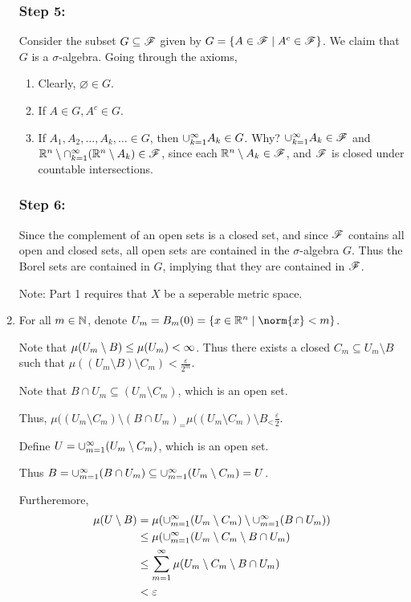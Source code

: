 \documentclass[x11names,reqno,14pt]{extarticle}
\newcommand{\seq}[2][\oo]{_{#2 = 1}^#1}
\newcommand{\cupk}[1][\oo]{\cup\seq[#1]{k}}
\newcommand{\capk}[1][\oo]{\cap\seq[#1]{k}}
\begin{document}
\begin{enumerate}
\subsubsection*{Step 5:} Consider the subset $G \subseteq\mathscr{F}$ given by $G = \{A\in\mathscr{F}\mid A^c\in\mathscr{F}\}$. We claim that $G$ is a $\sigma$-algebra. Going through the axioms, 
\begin{enumerate}[label=(\roman*)]

\item Clearly, $\varnothing\in G$. 

\item If $A \in G, A^c \in G$. 

\item If $A_1, A_2, \dots, A_k, \dots \in G$, then $\cupk A_k \in G$. Why? $\cupk A_k \in \ms{F}$ and $\R^n\setminus\capk(\R^n\setminus A_k) \in\ms{F}$, since each $\mathbb{R}^n\setminus A_k \in \mathscr{F}$, and $\mathscr{F}$ is closed under countable intersections. 

\end{enumerate}

\subsubsection*{Step 6:} Since the complement of an open sets is a closed set, and since $\mathscr{F}$ contains all open and closed sets, all open sets are contained in the $\sigma$-algebra $G$. Thus the Borel sets are contained in $G$, implying that they are contained in $\mathscr{F}$. 

Note: Part 1 requires that $X$ be a seperable metric space. 

\item For all $m \in \mathbb{N}$, denote $U_m = B_m(0) = \{x\in\R^n\mid\norm{x}<m\}$. 


Note that $\mu(U_m\setminus B) \leq \mu(U_m) < \infty$. Thus there exists a closed $C_m \subseteq U_m\setminus B$ such that $\mu((U_m\setminus B)\setminus C_m)<\frac{\varepsilon}{2^m}$. 

Note that $B \cap U_m \subseteq (U_m\setminus C_m)$, which is an open set. 

Thus, $\mu((U_m\setminus C_m)\setminus(B\cap U_m)_ = \mu((U_m\setminus C_m)\setminus B_ < \frac{\varepsilon}{2}$. 

Define $U = \cup\seq{m}(U_m\setminus C_m)$, which is an open set. 

Thus $B = \cup\seq{m}(B\cap U_m) \subseteq \cup\seq{m}(U_m\setminus C_m) = U$. 

Furtheremore,
\begin{align*}
\mu(U\setminus B) & = \mu(\cup\seq{m}(U_m\setminus C_m) \setminus \cup\seq{m}(B \cap U_m)) \\
& \leq \mu(\cup\seq{m}(U_m\setminus C_m \setminus B \cap U_m)\\
& \leq \sum\seq{m}\mu(U_m\setminus C_m\setminus B\cap U_m) \\
& < \varepsilon \\
\end{align*}


\end{enumerate}
\end{document}
